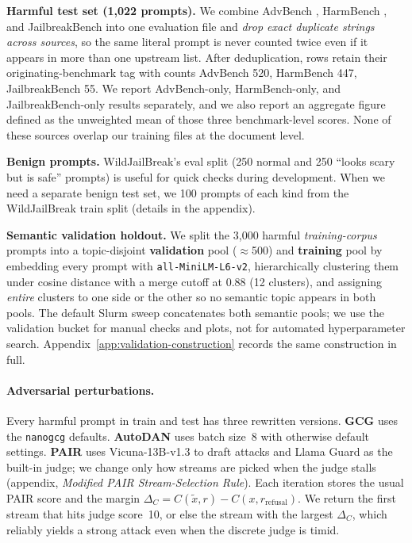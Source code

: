 \documentclass{article}
\begin{document}
\textbf{Harmful test set (1{,}022 prompts).} We combine AdvBench \citep{zou2023gcg}, HarmBench \citep{mazeika2024harmbench}, and JailbreakBench \citep{chao2024jailbreakbench} into one evaluation file and \emph{drop exact duplicate strings across sources}, so the same literal prompt is never counted twice even if it appears in more than one upstream list. After deduplication, rows retain their originating-benchmark tag with counts AdvBench 520, HarmBench 447, JailbreakBench 55. %
We report AdvBench-only, HarmBench-only, and JailbreakBench-only results separately, and we also report an aggregate figure defined as the unweighted mean of those three benchmark-level scores. None of these sources overlap our training files at the document level.

\textbf{Benign prompts.} WildJailBreak's eval split (250 normal and 250 ``looks scary but is safe'' prompts) is useful for quick checks during development. When we need a separate benign test set, we 100 prompts of each kind from the WildJailBreak train split (details in the appendix).

\textbf{Semantic validation holdout.} We split the 3{,}000 harmful \emph{training-corpus} prompts into a topic-disjoint \textbf{validation} pool ($\approx$500) and \textbf{training} pool by embedding every prompt with \texttt{all-MiniLM-L6-v2}, hierarchically clustering them under cosine distance with a merge cutoff at $0.88$ (12 clusters), and assigning \emph{entire} clusters to one side or the other so no semantic topic appears in both pools. The default Slurm sweep concatenates both semantic pools; we use the validation bucket for manual checks and plots, not for automated hyperparameter search. Appendix~\ref{app:validation-construction} records the same construction in full.

\label{sec:exp-adversarial}
\paragraph{Adversarial perturbations.}
Every harmful prompt in train and test has three rewritten versions. \textbf{GCG} \citep{zou2023gcg} uses the \texttt{nanogcg} defaults. \textbf{AutoDAN} \citep{liu2024autodan} uses batch size~8 with otherwise default settings. \textbf{PAIR} \citep{chao2023pair} uses Vicuna-13B-v1.3 \citep{zheng2023vicuna} to draft attacks and Llama Guard as the built-in judge; we change only how streams are picked when the judge stalls (appendix, \emph{Modified PAIR Stream-Selection Rule}). Each iteration stores the usual PAIR score and the margin $\Delta_C = C(\tilde{x},r)-C(x,r_{\text{refusal}})$. We return the first stream that hits judge score~10, or else the stream with the largest $\Delta_C$, which reliably yields a strong attack even when the discrete judge is timid.
\end{document}
